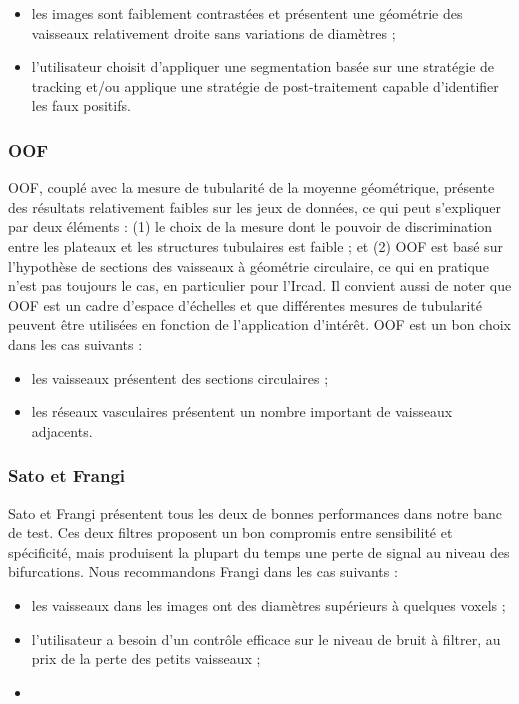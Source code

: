 \begin{itemize}
  \item les images sont faiblement contrastées et présentent une géométrie des vaisseaux relativement droite sans variations de diamètres ;
  \item l'utilisateur choisit d'appliquer une segmentation basée sur une stratégie de tracking et/ou applique une stratégie de post-traitement capable d'identifier les faux positifs.
\end{itemize}

\subsubsection*{OOF}

OOF, couplé avec la mesure de tubularité de la moyenne géométrique, présente des résultats relativement faibles sur les jeux de données, ce qui peut s'expliquer par deux éléments : (1) le choix de la mesure dont le pouvoir de discrimination entre les plateaux et les structures tubulaires est faible ; et (2) OOF est basé sur l'hypothèse de sections des vaisseaux à géométrie circulaire, ce qui en pratique n'est pas toujours le cas, en particulier pour l'Ircad. Il convient aussi de noter que OOF est un cadre d'espace d'échelles et que différentes mesures de tubularité peuvent être utilisées en fonction de l'application d'intérêt. OOF est un bon choix dans les cas suivants : 

\begin{itemize}
  \item les vaisseaux présentent des sections circulaires ;
  \item les réseaux vasculaires présentent un nombre important de vaisseaux adjacents.
\end{itemize}

\subsubsection{Sato et Frangi}

Sato et Frangi présentent tous les deux de bonnes performances dans notre banc de test. Ces deux filtres proposent un bon compromis entre sensibilité et spécificité, mais produisent la plupart du temps une perte de signal au niveau des bifurcations. Nous recommandons Frangi dans les cas suivants :

\begin{itemize}
  \item les vaisseaux dans les images ont des diamètres supérieurs à quelques voxels ;
  \item l'utilisateur a besoin d'un contrôle efficace sur le niveau de bruit à filtrer, au prix de la perte des petits vaisseaux ;
  \item {}
\end{itemize}

